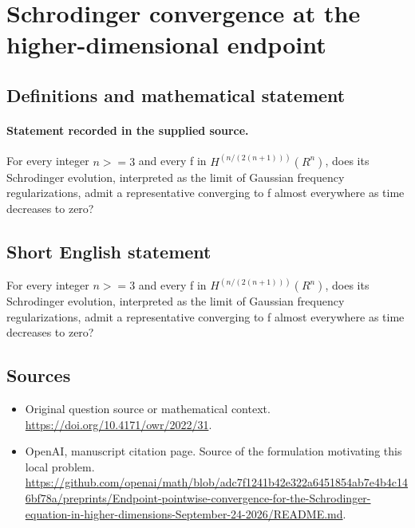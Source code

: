\documentclass[11pt]{article}
\begin{document}
\section*{Schrodinger convergence at the higher-dimensional endpoint}\label{statement}
\subsection{Definitions and mathematical statement}
\paragraph{Statement recorded in the supplied source.}
For every integer $n>=3$ and every f in $H^(n/(2(n+1)))(R^n)$, does its Schrodinger evolution, interpreted as the limit of Gaussian frequency regularizations, admit a representative converging to f almost everywhere as time decreases to zero?
\subsection{Short English statement}
For every integer $n>=3$ and every f in $H^(n/(2(n+1)))(R^n)$, does its Schrodinger evolution, interpreted as the limit of Gaussian frequency regularizations, admit a representative converging to f almost everywhere as time decreases to zero?
\subsection{Sources}
\begin{itemize}
\item[S1] Original question source or mathematical context.
\url{https://doi.org/10.4171/owr/2022/31}.
\item[S2] OpenAI, manuscript citation page. Source of the formulation motivating this local problem.
\url{https://github.com/openai/math/blob/adc7f1241b42e322a6451854ab7e4b4c146bf78a/preprints/Endpoint-pointwise-convergence-for-the-Schrodinger-equation-in-higher-dimensions-September-24-2026/README.md}.
\end{itemize}
\end{document}
